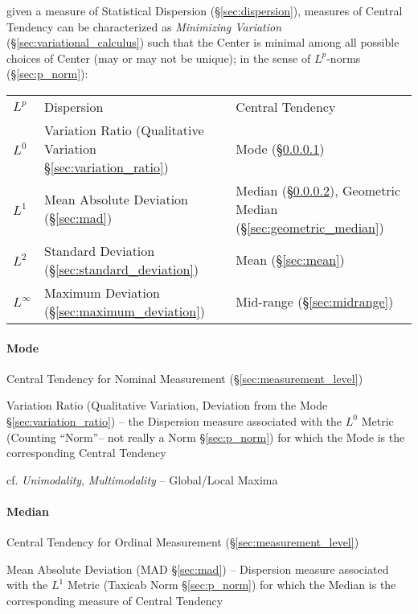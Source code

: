 given a measure of Statistical Dispersion (\S\ref{sec:dispersion}), measures of
Central Tendency can be characterized as \emph{Minimizing Variation}
(\S\ref{sec:variational_calculus}) such that the Center is minimal among all
possible choices of Center (may or may not be unique); in the sense of
$L^p$-norms (\S\ref{sec:p_norm}):
\begin{tabular}{l l l}
  $L^p$ & Dispersion & Central Tendency \\
  $L^0$ & Variation Ratio (Qualitative Variation \S\ref{sec:variation_ratio})
    & Mode (\S\ref{sec:mode}) \\
  $L^1$ & Mean Absolute Deviation (\S\ref{sec:mad})
    & Median (\S\ref{sec:median}),
      Geometric Median (\S\ref{sec:geometric_median}) \\
  $L^2$ & Standard Deviation (\S\ref{sec:standard_deviation})
    & Mean (\S\ref{sec:mean}) \\
  $L^\infty$ & Maximum Deviation (\S\ref{sec:maximum_deviation})
    & Mid-range (\S\ref{sec:midrange})
\end{tabular}



\paragraph{Mode}\label{sec:mode}\hfill

Central Tendency for Nominal Measurement (\S\ref{sec:measurement_level})

\fist Variation Ratio (Qualitative Variation, Deviation from the Mode
\S\ref{sec:variation_ratio}) -- the Dispersion measure associated with the $L^0$
Metric (Counting ``Norm''-- not really a Norm \S\ref{sec:p_norm}) for which the
Mode is the corresponding Central Tendency

cf. \emph{Unimodality}, \emph{Multimodality} -- Global/Local Maxima



\paragraph{Median}\label{sec:median}\hfill

Central Tendency for Ordinal Measurement (\S\ref{sec:measurement_level})

\fist Mean Absolute Deviation (MAD \S\ref{sec:mad}) -- Dispersion measure
associated with the $L^1$ Metric (Taxicab Norm \S\ref{sec:p_norm}) for which the
Median is the corresponding measure of Central Tendency

